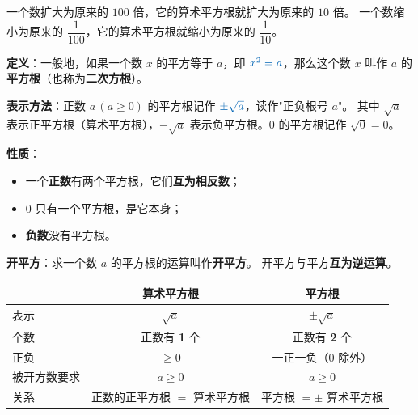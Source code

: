\documentclass[11pt,a4paper]{ctexart}
\newcommand{\key}[1]{\textcolor{accent}{\textbf{#1}}}
\newcommand{\formula}[1]{\textcolor{primary}{\textbf{$#1$}}}
\begin{document}
\begin{knowledge}
一个数扩大为原来的 $100$ 倍，它的算术平方根就扩大为原来的 $10$ 倍。
一个数缩小为原来的 $\dfrac{1}{100}$，它的算术平方根就缩小为原来的 $\dfrac{1}{10}$。

\begin{center}
\end{center}
\end{knowledge}

\begin{knowledge}
\textbf{定义}：一般地，如果一个数 $x$ 的平方等于 $a$，即 $\formula{x^2=a}$，那么这个数 $x$ 叫作 $a$ 的\key{平方根}（也称为\textbf{二次方根}）。

\vspace{0.3em}
\textbf{表示方法}：正数 $a\,(a\geq 0)$ 的平方根记作 $\formula{\pm\sqrt{a}}$，读作"正负根号 $a$"。
其中 $\sqrt{a}$ 表示正平方根（算术平方根），$-\sqrt{a}$ 表示负平方根。$0$ 的平方根记作 $\sqrt{0}=0$。

\vspace{0.3em}
\textbf{性质}：
\begin{itemize}[leftmargin=1.8em]
  \item 一个\textbf{正数}有两个平方根，它们\key{互为相反数}；
  \item $0$ 只有一个平方根，是它本身；
  \item \textbf{负数}没有平方根。
\end{itemize}

\vspace{0.3em}
\textbf{开平方}：求一个数 $a$ 的平方根的运算叫作\key{开平方}。
开平方与平方\textbf{互为逆运算}。
\end{knowledge}

\begin{knowledge}
\begin{center}
\begin{tabular}{lcc}
  \toprule
  & \textbf{算术平方根} & \textbf{平方根} \\
  \midrule
  表示 & $\sqrt{a}$ & $\pm\sqrt{a}$ \\
  个数 & 正数有 \textbf{1} 个 & 正数有 \textbf{2} 个 \\
  正负 & $\geq 0$ & 一正一负（$0$ 除外） \\
  被开方数要求 & $a\geq 0$ & $a\geq 0$ \\
  关系 & 正数的正平方根 $=$ 算术平方根 & 平方根 $=\pm$ 算术平方根 \\
  \bottomrule
\end{tabular}
\end{center}
\end{knowledge}
\end{document}
